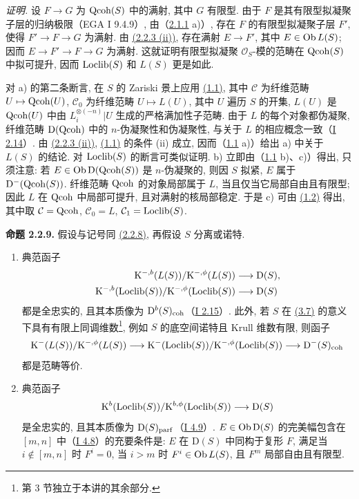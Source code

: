 \emph{证明.} 设 $F\to G$ 为 $\operatorname{Qcoh}(S)$ 中的满射, 其中 $G$ 有限型. 由于 $F$ 是其有限型拟凝聚子层的归纳极限（EGA I 9.4.9）, 由（\hyperlink{sga6.e02.lem.2-1-1}{2.1.1} a)）, 存在 $F$ 的有限型拟凝聚子层 $F'$, 使得 $F'\to F\to G$ 为满射. 由 \hyperlink{sga6.e02.prop.2-2-3}{(2.2.3 (ii))}, 存在满射 $E\to F'$, 其中 $E\in\operatorname{Ob} L(S)$; 因而 $E\to F'\to F\to G$ 为满射. 这就证明有限型拟凝聚 $\mathcal O_S$-模的范畴在 $\operatorname{Qcoh}(S)$ 中拟可提升, 因而 $\operatorname{Loclib}(S)$ 和 $L(S)$ 更是如此.

对 a) 的第二条断言, 在 $S$ 的 Zariski 景上应用 \hyperlink{sga6.e02.prop.1-1}{(1.1)}, 其中 $\mathcal C$ 为纤维范畴 $U\mapsto\operatorname{Qcoh}(U)$, $\mathcal C_0$ 为纤维范畴 $U\mapsto L(U)$, 其中 $U$ 遍历 $S$ 的开集, $L(U)$ 是 $\operatorname{Qcoh}(U)$ 中由 $L_i^{\otimes(-n)}|U$ 生成的严格满加性子范畴. 由于 $L$ 的每个对象都伪凝聚, 纤维范畴 $\mathrm D(\operatorname{Qcoh})$ 中的 $n$-伪凝聚性和伪凝聚性, 与关于 $L$ 的相应概念一致（\hyperlink{sga6.e01.cor.2-14}{I 2.14}）. 由 \hyperlink{sga6.e02.prop.2-2-3}{(2.2.3 (ii))}, \hyperlink{sga6.e02.prop.1-1}{(1.1)} 的条件 (ii) 成立, 因而（\hyperlink{sga6.e02.prop.1-1}{1.1} a)）给出 a) 中关于 $L(S)$ 的结论. 对 $\operatorname{Loclib}(S)$ 的断言可类似证明. b) 立即由（\hyperlink{sga6.e02.prop.1-1}{1.1} b)、c)）得出, 只须注意: 若 $E\in\operatorname{Ob}\mathrm D(\operatorname{Qcoh}(S))$ 是 $n$-伪凝聚的, 则因 $S$ 拟紧, $E$ 属于 $\mathrm D^{-}(\operatorname{Qcoh}(S))$. 纤维范畴 $\operatorname{Qcoh}$ 的对象局部属于 $L$, 当且仅当它局部自由且有限型; 因此 $L$ 在 $\operatorname{Qcoh}$ 中局部可提升, 且对满射的核局部稳定. 于是 c) 可由 \hyperlink{sga6.e02.prop.1-2}{(1.2)} 得出, 其中取 $\mathcal C=\operatorname{Qcoh}$, $\mathcal C_0=L$, $\mathcal C_1=\operatorname{Loclib}(S)$.

\textbf{命题 2.2.9.} 假设与记号同 \hyperlink{sga6.e02.thm.2-2-8}{(2.2.8)}, 再假设 $S$ 分离或诺特.
\begin{enumerate}[label=\alph*)]
\item 典范函子
\[
\begin{aligned}
\mathrm K^{-,b}(L(S))/\mathrm K^{-,\phi}(L(S))&\longrightarrow \mathrm D(S),\\
\mathrm K^{-,b}(\operatorname{Loclib}(S))/\mathrm K^{-,\phi}(\operatorname{Loclib}(S))&\longrightarrow \mathrm D(S)
\end{aligned}
\]
都是全忠实的, 且其本质像为 $\mathrm D^{b}(S)_{\mathrm{coh}}$（\hyperlink{sga6.e01.ex.2-15}{I 2.15}）. 此外, 若 $S$ 在 \hyperlink{sga6.e02.prop.3-7}{(3.7)} 的意义下具有有限上同调维数\footnote{第 3 节独立于本讲的其余部分.}, 例如 $S$ 的底空间诺特且 Krull 维数有限, 则函子
\[
\mathrm K^{-}(L(S))/\mathrm K^{-,\phi}(L(S))\longrightarrow
\mathrm K^{-}(\operatorname{Loclib}(S))/\mathrm K^{-,\phi}(\operatorname{Loclib}(S))\longrightarrow
\mathrm D^{-}(S)_{\mathrm{coh}}
\]
都是范畴等价.
\item 典范函子
\[
\mathrm K^b(\operatorname{Loclib}(S))/\mathrm K^{b,\phi}(\operatorname{Loclib}(S))\longrightarrow \mathrm D(S)
\]
是全忠实的, 且其本质像为 $\mathrm D(S)_{\mathrm{parf}}$（\hyperlink{sga6.e01.notation.4-9}{I 4.9}）. $E\in\operatorname{Ob}\mathrm D(S)$ 的完美幅包含在 $[m,n]$ 中（\hyperlink{sga6.e01.ex.4-8}{I 4.8}）的充要条件是: $E$ 在 $\mathrm D(S)$ 中同构于复形 $F$, 满足当 $i\notin[m,n]$ 时 $F^i=0$, 当 $i>m$ 时 $F^i\in\operatorname{Ob} L(S)$, 且 $F^m$ 局部自由且有限型.
\end{enumerate}

